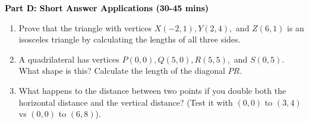 \documentclass[12pt, letterpaper, fleqn]{article}
\begin{document}
\newpage

\begin{tcolorbox}[colback=customteal!20]
\large\textcolor{black}{\textbf{Part D: Short Answer Applications (30-45 mins)}}
\end{tcolorbox}

\vspace{3mm}

\begin{enumerate}[itemsep=4.2cm, leftmargin=0.6cm, resume]
\item Prove that the triangle with vertices $X(-2, 1), Y(2, 4),$ and $Z(6, 1)$ is an isosceles triangle by calculating the lengths of all three sides.
\item A quadrilateral has vertices $P(0,0), Q(5,0), R(5,5),$ and $S(0,5)$. What shape is this? Calculate the length of the diagonal $PR$.
\item What happens to the distance between two points if you double both the horizontal distance and the vertical distance? (Test it with $(0,0)$ to $(3,4)$ vs $(0,0)$ to $(6,8)$).
\end{enumerate}
\end{document}
